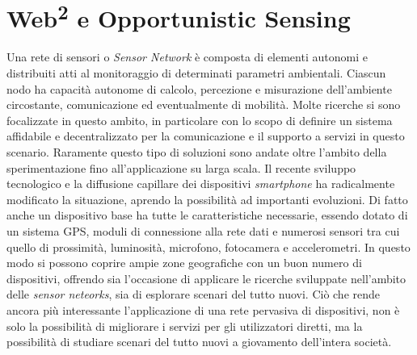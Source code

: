 \documentclass[a4paper, 12pt, twoside, openright]{book}
\begin{document}
\section{Web\textsuperscript{2} e Opportunistic Sensing}
Una rete di sensori o \emph{Sensor Network} è composta di elementi autonomi e distribuiti atti al monitoraggio di determinati parametri ambientali. Ciascun nodo ha capacità autonome di calcolo, percezione e misurazione dell'ambiente circostante, comunicazione ed eventualmente di mobilità. Molte ricerche si sono focalizzate in questo ambito, in particolare con lo scopo di definire un sistema affidabile e decentralizzato per la comunicazione e il supporto a servizi in questo scenario. Raramente questo tipo di soluzioni sono andate oltre l'ambito della sperimentazione fino all'applicazione su larga scala. Il recente sviluppo tecnologico e la diffusione capillare dei dispositivi \emph{smartphone} ha radicalmente modificato la situazione, aprendo la possibilità ad importanti evoluzioni. Di fatto anche un dispositivo base ha tutte le caratteristiche necessarie, essendo dotato di un sistema GPS, moduli di connessione alla rete dati e numerosi sensori tra cui quello di prossimità, luminosità, microfono, fotocamera e accelerometri. In questo modo si possono coprire ampie zone geografiche con un buon numero di dispositivi, offrendo sia l'occasione di applicare le ricerche sviluppate nell'ambito delle \emph{sensor neteorks}, sia di esplorare scenari del tutto nuovi. Ciò che rende ancora più interessante l'applicazione di una rete pervasiva di dispositivi, non è solo la possibilità di migliorare i servizi per gli utilizzatori diretti, ma la possibilità di studiare scenari del tutto nuovi a giovamento dell'intera società.
\end{document}
